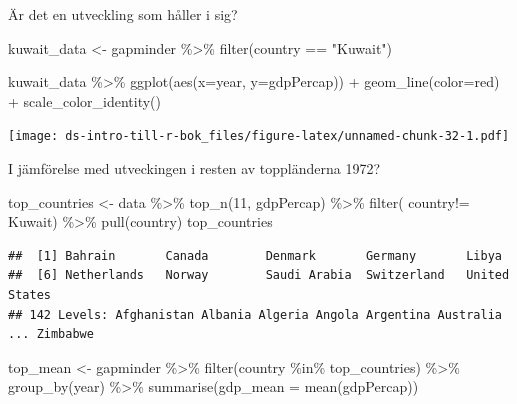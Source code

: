 \documentclass[
]{book}
\newenvironment{Shaded}{\begin{snugshade}}{\end{snugshade}}
\newcommand{\AttributeTok}[1]{\textcolor[rgb]{0.77,0.63,0.00}{#1}}
\newcommand{\DecValTok}[1]{\textcolor[rgb]{0.00,0.00,0.81}{#1}}
\newcommand{\FunctionTok}[1]{\textcolor[rgb]{0.00,0.00,0.00}{#1}}
\newcommand{\NormalTok}[1]{#1}
\newcommand{\OtherTok}[1]{\textcolor[rgb]{0.56,0.35,0.01}{#1}}
\newcommand{\SpecialCharTok}[1]{\textcolor[rgb]{0.00,0.00,0.00}{#1}}
\newcommand{\StringTok}[1]{\textcolor[rgb]{0.31,0.60,0.02}{#1}}
\begin{document}
Är det en utveckling som håller i sig?

\begin{Shaded}
\begin{Highlighting}[]
\NormalTok{kuwait\_data }\OtherTok{\textless{}{-}}\NormalTok{ gapminder }\SpecialCharTok{\%\textgreater{}\%} 
  \FunctionTok{filter}\NormalTok{(country }\SpecialCharTok{==} \StringTok{"Kuwait"}\NormalTok{)}

\NormalTok{kuwait\_data }\SpecialCharTok{\%\textgreater{}\%}
  \FunctionTok{ggplot}\NormalTok{(}\FunctionTok{aes}\NormalTok{(}\AttributeTok{x=}\NormalTok{year, }\AttributeTok{y=}\NormalTok{gdpPercap)) }\SpecialCharTok{+}
  \FunctionTok{geom\_line}\NormalTok{(}\AttributeTok{color=}\StringTok{\textquotesingle{}red\textquotesingle{}}\NormalTok{) }\SpecialCharTok{+} \FunctionTok{scale\_color\_identity}\NormalTok{()}
\end{Highlighting}
\end{Shaded}

\texttt{[image: ds-intro-till-r-bok\_files/figure-latex/unnamed-chunk-32-1.pdf]}

I jämförelse med utveckingen i resten av toppländerna 1972?

\begin{Shaded}
\begin{Highlighting}[]
\NormalTok{top\_countries }\OtherTok{\textless{}{-}}\NormalTok{ data }\SpecialCharTok{\%\textgreater{}\%}  \FunctionTok{top\_n}\NormalTok{(}\DecValTok{11}\NormalTok{, gdpPercap) }\SpecialCharTok{\%\textgreater{}\%} 
  \FunctionTok{filter}\NormalTok{( country}\SpecialCharTok{!=} \StringTok{\textquotesingle{}Kuwait\textquotesingle{}}\NormalTok{) }\SpecialCharTok{\%\textgreater{}\%} 
  \FunctionTok{pull}\NormalTok{(country)}
\NormalTok{top\_countries}
\end{Highlighting}
\end{Shaded}

\begin{verbatim}
##  [1] Bahrain       Canada        Denmark       Germany       Libya        
##  [6] Netherlands   Norway        Saudi Arabia  Switzerland   United States
## 142 Levels: Afghanistan Albania Algeria Angola Argentina Australia ... Zimbabwe
\end{verbatim}

\begin{Shaded}
\begin{Highlighting}[]
\NormalTok{top\_mean }\OtherTok{\textless{}{-}}\NormalTok{ gapminder }\SpecialCharTok{\%\textgreater{}\%} 
  \FunctionTok{filter}\NormalTok{(country }\SpecialCharTok{\%in\%}\NormalTok{ top\_countries) }\SpecialCharTok{\%\textgreater{}\%} 
  \FunctionTok{group\_by}\NormalTok{(year) }\SpecialCharTok{\%\textgreater{}\%}  
  \FunctionTok{summarise}\NormalTok{(}\AttributeTok{gdp\_mean =} \FunctionTok{mean}\NormalTok{(gdpPercap))}
\end{Highlighting}
\end{Shaded}
\end{document}
